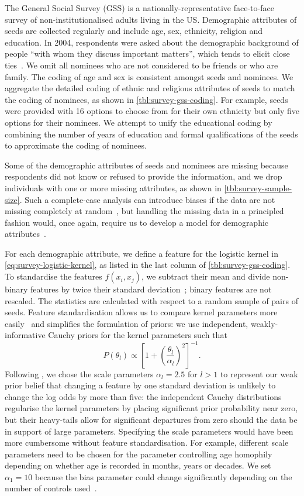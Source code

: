 \documentclass{scrartcl}
\begin{document}
The General Social Survey (GSS) is a nationally-representative face-to-face survey of non-institutionalised adults living in the US. Demographic attributes of seeds are collected regularly and include age, sex, ethnicity, religion and education. In 2004, respondents were asked about the demographic background of people ``with whom they discuss important matters'', which tends to elicit close ties~\cite{Marin2004}. We omit all nominees who are not considered to be friends or who are family. The coding of age and sex is consistent amongst seeds and nominees. We aggregate the detailed coding of ethnic and religious attributes of seeds to match the coding of nominees, as shown in \cref{tbl:survey-gss-coding}. For example, seeds were provided with 16 options to choose from for their own ethnicity but only five options for their nominees. We attempt to unify the educational coding by combining the number of years of education and formal qualifications of the seeds to approximate the coding of nominees.

Some of the demographic attributes of seeds and nominees are missing because respondents did not know or refused to provide the information, and we drop individuals with one or more missing attributes, as shown in \cref{tbl:survey-sample-size}. Such a complete-case analysis can introduce biases if the data are not missing completely at random~\cite{Rubin1976}, but handling the missing data in a principled fashion would, once again, require us to develop a model for demographic attributes~\cite{Pigott2001, Gelman2013}.

For each demographic attribute, we define a feature for the logistic kernel in \cref{eq:survey-logistic-kernel}, as listed in the last column of \cref{tbl:survey-gss-coding}. To standardise the features $f(x_i,x_j)$, we subtract their mean and divide non-binary features by twice their standard deviation~\cite{Gelman2008a}; binary features are not rescaled. The statistics are calculated with respect to a random sample of pairs of seeds. Feature standardisation allows us to compare kernel parameters more easily~\cite{Gelman2008a} and simplifies the formulation of priors: we use independent, weakly-informative Cauchy priors for the kernel parameters such that
\[
    P(\theta_l) \propto {\left[1+{\left(\frac{\theta_l}{\alpha_l}\right)}^2\right]}^{-1}.
\]
Following \textcite{Gelman2008}, we chose the scale parameters $\alpha_l=2.5$ for $l>1$ to represent our weak prior belief that changing a feature by one standard deviation is unlikely to change the log odds by more than five: the independent Cauchy distributions regularise the kernel parameters by placing significant prior probability near zero, but their heavy-tails allow for significant departures from zero should the data be in support of large parameters. Specifying the scale parameters would have been more cumbersome without feature standardisation. For example, different scale parameters need to be chosen for the parameter controlling age homophily depending on whether age is recorded in months, years or decades. We set $\alpha_1=10$ because the bias parameter could change significantly depending on the number of controls used~\cite{Gelman2013}.
\end{document}
